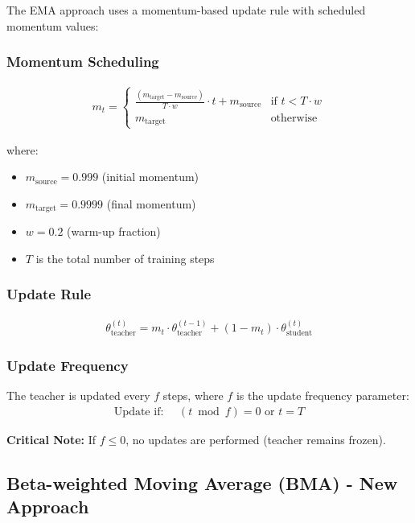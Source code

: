 \documentclass[11pt]{article}
\begin{document}
The EMA approach uses a momentum-based update rule with scheduled momentum values:

\subsubsection{Momentum Scheduling}
\begin{align}
m_t = \begin{cases} 
\frac{(m_{\text{target}} - m_{\text{source}})}{T \cdot w} \cdot t + m_{\text{source}} & \text{if } t < T \cdot w \\
m_{\text{target}} & \text{otherwise}
\end{cases}
\end{align}

where:
\begin{itemize}
\item $m_{\text{source}} = 0.999$ (initial momentum)
\item $m_{\text{target}} = 0.9999$ (final momentum)
\item $w = 0.2$ (warm-up fraction)
\item $T$ is the total number of training steps
\end{itemize}

\subsubsection{Update Rule}
\begin{align}
\theta_{\text{teacher}}^{(t)} = m_t \cdot \theta_{\text{teacher}}^{(t-1)} + (1 - m_t) \cdot \theta_{\text{student}}^{(t)}
\end{align}

\subsubsection{Update Frequency}
The teacher is updated every $f$ steps, where $f$ is the update frequency parameter:
\begin{align}
\text{Update if: } \quad (t \bmod f) = 0 \text{ or } t = T
\end{align}

\textbf{Critical Note:} If $f \leq 0$, no updates are performed (teacher remains frozen).

\subsection{Beta-weighted Moving Average (BMA) - New Approach}
\end{document}
